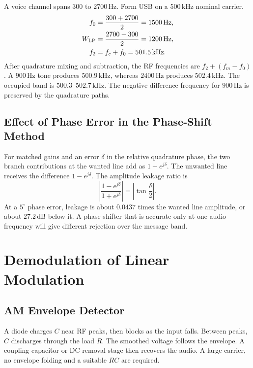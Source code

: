 \documentclass[12pt,a4paper]{article}
\begin{document}
\begin{tcolorbox}[examplebox, title={Weaver Frequency Plan for a Speech Channel}]
A voice channel spans $300$ to $2700\,\mathrm{Hz}$. Form USB on a $500\,\mathrm{kHz}$ nominal carrier.
\[
\begin{aligned}
 f_0&=\frac{300+2700}{2}=1500\,\mathrm{Hz},\\
 W_{\rm LP}&=\frac{2700-300}{2}=1200\,\mathrm{Hz},\\
 f_2&=f_c+f_0=501.5\,\mathrm{kHz}.
\end{aligned}
\]
After quadrature mixing and subtraction, the RF frequencies are $f_2+(f_m-f_0)$. A $900\,\mathrm{Hz}$ tone produces $500.9\,\mathrm{kHz}$, whereas $2400\,\mathrm{Hz}$ produces $502.4\,\mathrm{kHz}$. The occupied band is $500.3$--$502.7\,\mathrm{kHz}$. The negative difference frequency for $900\,\mathrm{Hz}$ is preserved by the quadrature paths.
\end{tcolorbox}

\subsection{Effect of Phase Error in the Phase-Shift Method}
For matched gains and an error $\delta$ in the relative quadrature phase, the two branch contributions at the wanted line add as $1+e^{j\delta}$. The unwanted line receives the difference $1-e^{j\delta}$. The amplitude leakage ratio is
\[
 \left|\frac{1-e^{j\delta}}{1+e^{j\delta}}\right|
   =\left|\tan\frac{\delta}{2}\right|.
\]
At a $5^\circ$ phase error, leakage is about $0.0437$ times the wanted line amplitude, or about $27.2\,\mathrm{dB}$ below it. A phase shifter that is accurate only at one audio frequency will give different rejection over the message band.

\section{Demodulation of Linear Modulation}
\subsection{AM Envelope Detector}
\begin{tcolorbox}[defbox, title={Diode Peak Detector}]
A diode charges $C$ near RF peaks, then blocks as the input falls. Between peaks, $C$ discharges through the load $R$. The smoothed voltage follows the envelope. A coupling capacitor or DC removal stage then recovers the audio. A large carrier, no envelope folding and a suitable $RC$ are required.
\end{tcolorbox}
\end{document}
